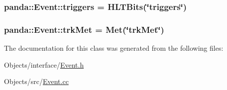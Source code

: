 \label{classpanda_1_1Event_a40e09c3f99a6e0207d60413940ae1876}
\hypertarget{classpanda_1_1Event_ab9d5a4256dc7589d57ea44924e961162}{
\subsubsection[{triggers}]{ {\bf panda::Event::triggers} = {\bf HLTBits}(\char`\"{}triggers\char`\"{})}}
\label{classpanda_1_1Event_ab9d5a4256dc7589d57ea44924e961162}
\hypertarget{classpanda_1_1Event_a4fb679e95824515627bc4665b39ba7f2}{
\subsubsection[{trkMet}]{ {\bf panda::Event::trkMet} = {\bf Met}(\char`\"{}trkMet\char`\"{})}}
\label{classpanda_1_1Event_a4fb679e95824515627bc4665b39ba7f2}


The documentation for this class was generated from the following files:\begin{DoxyCompactItemize}
\item 
Objects/interface/\hyperlink{Event_8h}{Event.h}\item 
Objects/src/\hyperlink{Event_8cc}{Event.cc}\end{DoxyCompactItemize}
